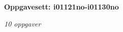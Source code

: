 \centerline{\bf Oppgavesett: i01121no-i01130no}
\vskip 10pt
\centerline{\it 10 oppgaver}\vskip 10pt
\vskip 10pt
